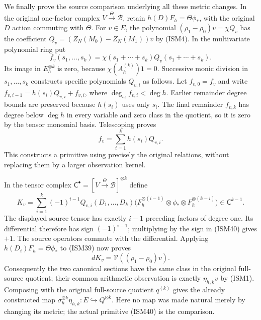 We finally prove the source comparison underlying
all these metric changes.  In the original
one-factor complex \(V\xrightarrow{\Theta}\mathscr B\),
retain \(h(D)F_h=\Theta\phi_*\), with the original
\(D\) action commuting with \(\Theta\).
For \(v\in E\), the polynomial
\((\rho_1-\rho_0)v=\chi Q_v\) has the coefficient
\(Q_v=(Z_N(M_0)-Z_N(M_1))v\) by (ISM4).
In the multivariate polynomial ring put
\[
 f_v(s_1,\ldots,s_k)
  =\chi(s_1+\cdots+s_k)Q_v(s_1+\cdots+s_k).
 \tag{ISM38}
\]
Its image in \(E_h^{\otimes k}\) is zero, because
\(\chi(A_h^{(k)})1=0\).  Successive monic division
in \(s_1,\ldots,s_k\) constructs specific polynomials
\(Q_{v,i}\) as follows.  Let \(f_{v,0}=f_v\) and write
\(f_{v,i-1}=h(s_i)Q_{v,i}+f_{v,i}\), where
\(\deg_{s_i}f_{v,i}<\deg h\).  Earlier remainder
degree bounds are preserved because \(h(s_i)\)
uses only \(s_i\).  The final remainder \(f_{v,k}\)
has degree below \(\deg h\) in every variable and
zero class in the quotient, so it is zero by the
tensor monomial basis.  Telescoping proves
\[
 f_v=\sum_{i=1}^kh(s_i)Q_{v,i}.
 \tag{ISM39}
\]
This constructs a primitive using precisely the
original relations, without replacing them by a
larger observation kernel.

In the tensor complex
\(\mathsf C^\bullet=[V\xrightarrow{\Theta}\mathscr B]^{\otimes k}\)
define
\[
 K_v=\sum_{i=1}^k(-1)^{i-1}Q_{v,i}(D_1,\ldots,D_k)
  \bigl(F_h^{\otimes(i-1)}\otimes\phi_*
                   \otimes F_h^{\otimes(k-i)}\bigr)
       \in\mathsf C^{k-1}.
 \tag{ISM40}
\]
The displayed source tensor has exactly \(i-1\)
preceding factors of degree one.  Its differential
therefore has sign \((-1)^{i-1}\); multiplying by
the sign in (ISM40) gives \(+1\).  The source
operators commute with the differential.  Applying
\(h(D_i)F_h=\Theta\phi_*\) to (ISM39) now proves
\[
 dK_v=\mathcal V((\rho_1-\rho_0)v).
 \tag{ISM41}
\]
Consequently the two canonical sections have the
same class in the original full-source quotient;
their common arithmetic observation is exactly
\(\eta_{h,k}v\) by (ISM1).  Composing with the
original full-source quotient \(q^{(k)}\) gives
the already constructed map
\(\sigma_h^{\otimes k}\eta_{h,k}:E\hookrightarrow Q^{\otimes k}\).
Here no map was made natural merely by changing
its metric; the actual primitive (ISM40) is the
comparison.

